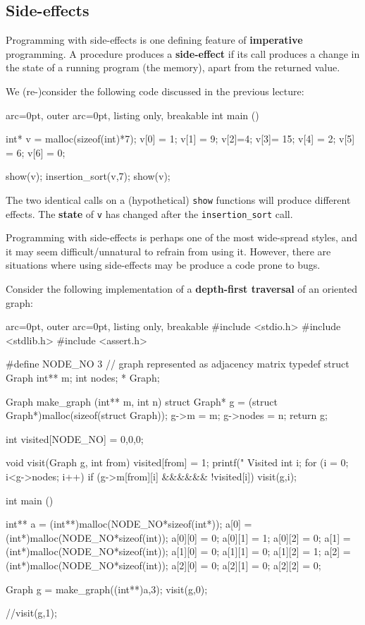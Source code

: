 \subsection*{ Side-effects }

Programming with side-effects is one defining feature of \textbf{imperative} programming. A procedure produces a \textbf{side-effect} if its call produces a change in the state of a running program (the memory), apart from the returned value.

We (re-)consider the following code discussed in the previous lecture:


\begin{tcblisting}{ arc=0pt, outer arc=0pt, listing only, breakable}
int main (){

	int* v = malloc(sizeof(int)*7);
	v[0] = 1; v[1] = 9; v[2]=4; v[3]= 15; v[4] = 2; v[5] = 6; v[6] = 0;

        show(v);
	insertion_sort(v,7);
        show(v);
}

\end{tcblisting}


The two identical calls on a (hypothetical) \texttt{show} functions will produce different effects. The \textbf{state} of \texttt{v} has changed after the \texttt{insertion\_sort} call.

Programming with side-effects is perhaps one of the most wide-spread styles, and it may seem difficult/unnatural to refrain from using it. However, there are situations where using side-effects may be produce a code prone to bugs.

Consider the following implementation of a \textbf{depth-first traversal} of an oriented graph:


\begin{tcblisting}{ arc=0pt, outer arc=0pt, listing only, breakable}
#include <stdio.h>
#include <stdlib.h>
#include <assert.h> 
 
#define NODE_NO 3
// graph represented as adjacency matrix
typedef struct Graph {
	int** m;
	int nodes;
}* Graph;
 
Graph make_graph (int** m, int n){
	struct Graph* g = (struct Graph*)malloc(sizeof(struct Graph));
	g->m = m;
	g->nodes = n;
	return g;
}
 
int visited[NODE_NO] = {0,0,0};
 
void visit(Graph g, int from){
	visited[from] = 1;
	printf(" Visited %
	int i;
	for (i = 0; i<g->nodes; i++){
		if (g->m[from][i] &\&&&\&& !visited[i])
			visit(g,i);
	}
}

int main (){

	int** a = (int**)malloc(NODE_NO*sizeof(int*));
	a[0] = (int*)malloc(NODE_NO*sizeof(int));
	a[0][0] = 0; a[0][1] = 1; a[0][2] = 0;
	a[1] = (int*)malloc(NODE_NO*sizeof(int));
	a[1][0] = 0; a[1][1] = 0; a[1][2] = 1;
	a[2] = (int*)malloc(NODE_NO*sizeof(int));
	a[2][0] = 0; a[2][1] = 0; a[2][2] = 0;

	Graph g = make_graph((int**)a,3);
	visit(g,0);

	//visit(g,1);

}



\end{tcblisting}


